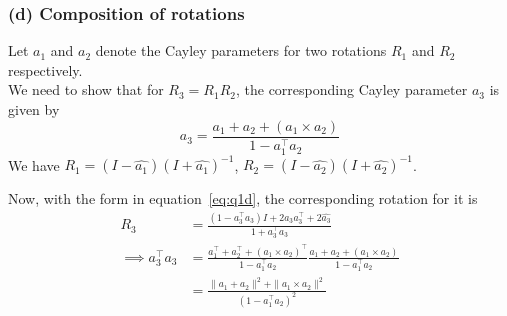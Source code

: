 \subsubsection*{(d) Composition of rotations}

Let \( a_{1} \) and \( a_{2} \) denote the Cayley parameters for two rotations \( R_{1} \) and \( R_{2} \) respectively. \\
We need to show that for \( R_{3}=R_{1} R_{2} \), the corresponding Cayley parameter \( a_{3} \) is given by
\begin{equation}\label{eq:q1d}
    a_{3}=\frac{a_{1}+a_{2}+\left(a_{1} \times a_{2}\right)}{1-a_{1}^{\top} a_{2}}
\end{equation}
We have \( R_1 = (I - \widehat{a_1}) {(I + \widehat{a_1})}^{-1} \), \( R_2 = (I - \widehat{a_2}) {(I + \widehat{a_2})}^{-1} \).

Now, with the form in equation~\eqref{eq:q1d}, the corresponding rotation for it is
\begin{align*}
    R_{3}
     & =
    \frac{(1 - a_3^{\top} a_3) I + 2 a_3 a_3^{\top} + 2 \widehat{a_3}}{1 + a_3^{\top} a_3}
    \\
    \implies
    a_3^{\top} a_3
     & =
    \frac{a_{1}^\top+a_{2}^\top+\left(a_{1} \times a_{2}\right)^\top}{1-a_{1}^{\top} a_{2}}
    \frac{a_{1}+a_{2}+\left(a_{1} \times a_{2}\right)}{1-a_{1}^{\top} a_{2}}
    \\ & =
    \frac{
    \| a_1 + a_2 \|^2 + \| a_1 \times a_2 \|^2
    }{{(1-a_{1}^{\top} a_{2})}^{2}}
\end{align*}
